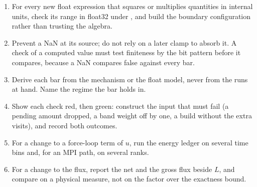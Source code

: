 \begin{enumerate}
  \item For every new float expression that squares or multiplies
    quantities in internal units, check its range in float32 under
    , and build the boundary configuration rather than
    trusting the algebra.
  \item Prevent a NaN at its source; do not rely on a later clamp to
    absorb it. A check of a computed value must test finiteness by the bit
    pattern before it compares, because a NaN compares false against every
    bar.
  \item Derive each bar from the mechanism or the float model, never from
    the runs at hand. Name the regime the bar holds in.
  \item Show each check red, then green: construct the input that must
    fail (a pending amount dropped, a band weight off by one, a build
    without the extra visits), and record both outcomes.
  \item For a change to a force-loop term of $u$, run the energy ledger
    on several time bins and, for an MPI path, on several ranks.
  \item For a change to the flux, report the net and the gross flux beside
    $L$, and compare on a physical measure, not on the factor over the
    exactness bound.
\end{enumerate}
